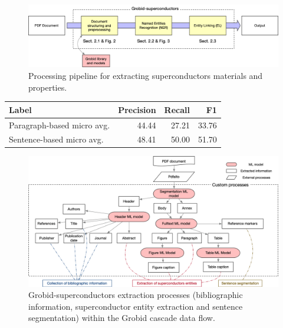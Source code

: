 \documentclass[]{interact}
\theoremstyle{plain}%
\theoremstyle{definition}
\theoremstyle{remark}
\begin{document}
\begin{figure}[ht]
    \includegraphics[width=\textwidth]{schema-architecture-colors}
    \caption{Processing pipeline for extracting superconductors materials and properties. }
    \label{fig:pipeline-overview}
\end{figure}


\begin{table}[ht]
    \centering
    {
        \begin{tabular}{lrrr}
            \toprule
            \textbf{Label}             & \textbf{Precision} & \textbf{Recall} & \textbf{F1} \\
            \midrule
            Paragraph-based micro avg. & 44.44              & 27.21           & 33.76       \\
            Sentence-based micro avg.  & 48.41              & 50.00           & 51.70       \\
            \bottomrule
        \end{tabular}
    }
    \label{tab:comparison-evaluation-sentences-paragraphs}
\end{table}

\begin{figure}[ht]
    \includegraphics[width=\textwidth]{document-structuring-colors}
    \caption{Grobid-superconductors extraction processes (bibliographic information, superconductor entity extraction and sentence segmentation) within the Grobid cascade data flow.}
    \label{fig:grobid-document-processing}
\end{figure}
\end{document}
